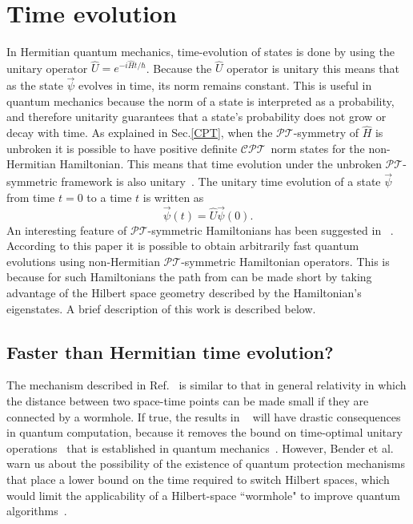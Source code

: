 \documentclass[12pt, a4paper]{report}
\newcommand\PT{\(\mathcal{PT}\)}
\newcommand\CPT{\(\mathcal{CPT}\)}
\begin{document}
\chapter{Time evolution}\label{TEv}
In Hermitian quantum mechanics, time-evolution of states is done by using the unitary operator $\hat{U} = e^{-i\hat{H}t/\hbar}$. Because the $\hat{U}$ operator is unitary this means that as the state $\vec{\psi}$ evolves in time, its norm remains constant. This is useful in quantum mechanics because the norm of a state is interpreted as a probability, and therefore unitarity guarantees that a state's probability does not grow or decay with time. As explained in Sec.\ref{CPT}, when the \PT-symmetry of $\hat{H}$ is unbroken it is possible to have positive definite \CPT norm states for the non-Hermitian Hamiltonian. This means that time evolution under the unbroken \PT-symmetric framework is also unitary~\cite{Jones-Smith, ComplexExtension, Mostafazadeh2}. 
The unitary time evolution of a state $\vec{\psi}$ from time $t = 0$ to a time $t$ is written as
\begin{equation}\label{eq:4.1}
\vec{\psi}(t) = \hat{U} \vec{\psi}(0).
\end{equation}
An interesting feature of \PT-symmetric Hamiltonians has been suggested in ~\cite{Bender_2007}. According to this paper it is possible to obtain arbitrarily fast quantum evolutions using non-Hermitian \PT-symmetric Hamiltonian operators. This is because for such Hamiltonians the path from can be made short by taking advantage of the Hilbert space geometry described by the Hamiltonian's eigenstates.
A brief description of this work is described below.

\section{Faster than Hermitian time evolution?}\label{faster}
The mechanism described in Ref.~\cite{Bender_2007} is similar to that in general relativity in which the distance between two space-time points can be made small if they are connected by a wormhole. If true, the results in ~\cite{Bender_2007} will have drastic consequences in quantum computation, because it removes the bound on time-optimal unitary operations~\cite{OptimalControl} that is established in quantum mechanics~\cite{Brachistochrone_Mostafazadeh}. However, Bender et al. warn us about the possibility of the existence of quantum protection mechanisms that place a lower bound on the time required to switch Hilbert spaces, which would limit the applicability of a Hilbert-space ``wormhole" to improve quantum algorithms~\cite{Bender_2007}. 
\end{document}
